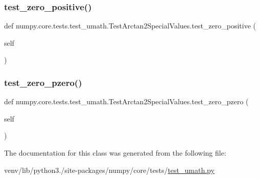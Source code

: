\subsubsection{\texorpdfstring{test\+\_\+zero\+\_\+positive()}{test\_zero\_positive()}}
{\footnotesize\ttfamily def numpy.\+core.\+tests.\+test\+\_\+umath.\+Test\+Arctan2\+Special\+Values.\+test\+\_\+zero\+\_\+positive (\begin{DoxyParamCaption}\item[{}]{self }\end{DoxyParamCaption})}

\mbox{\label{classnumpy_1_1core_1_1tests_1_1test__umath_1_1TestArctan2SpecialValues_a03a26c1b9755cbc513596df4443c382d}} 
\subsubsection{\texorpdfstring{test\+\_\+zero\+\_\+pzero()}{test\_zero\_pzero()}}
{\footnotesize\ttfamily def numpy.\+core.\+tests.\+test\+\_\+umath.\+Test\+Arctan2\+Special\+Values.\+test\+\_\+zero\+\_\+pzero (\begin{DoxyParamCaption}\item[{}]{self }\end{DoxyParamCaption})}



The documentation for this class was generated from the following file\+:\begin{DoxyCompactItemize}
\item 
venv/lib/python3./site-\/packages/numpy/core/tests/\hyperlink{test__umath_8py}{test\+\_\+umath.\+py}\end{DoxyCompactItemize}

